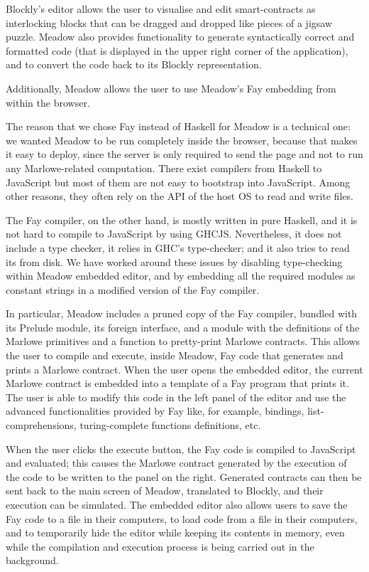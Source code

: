 \documentclass[runningheads]{llncs}
\begin{document}
Blockly's editor allows the user to visualise and edit
smart-contracts as interlocking blocks that can be dragged and dropped
like pieces of a jigsaw puzzle. %
Meadow also provides functionality to generate syntactically correct
and formatted code (that is displayed in the upper right corner of the application),
and to convert the code back to its Blockly representation.

Additionally, Meadow allows the user to use Meadow's Fay embedding from within the browser. %

The reason that we chose Fay instead of Haskell for Meadow is a technical one: we wanted Meadow to be run completely inside 
the browser, because that makes it easy to deploy, since the server is only required to send the page and not to 
run any Marlowe-related computation. There exist compilers from Haskell to JavaScript but most of them are not easy to 
bootstrap into JavaScript. Among other reasons, they often rely on the API of the host OS to read and write files.

The Fay compiler, on the other hand, is mostly written in pure Haskell, and it is not hard to compile to JavaScript by 
using GHCJS. Nevertheless, it does not include a type checker, it relies in GHC's type-checker; and it also 
tries to read its  from disk. We have worked around these issues by disabling type-checking 
within Meadow embedded editor, and by embedding all the required modules as constant strings in a modified version 
of the Fay compiler.

In particular, Meadow includes a pruned copy of the Fay compiler, bundled with its Prelude module, its foreign 
interface, and a module with the definitions of the Marlowe primitives and a function to pretty-print 
Marlowe contracts. This allows the user to compile and execute, inside Meadow, Fay code that generates and prints 
a Marlowe contract. When the user opens the embedded editor, the current Marlowe contract is embedded into a template 
of a Fay program that prints it. The user is able to modify this code in the left panel of the editor and use the 
advanced functionalities provided by Fay like, for example, bindings, list-comprehensions, turing-complete functions 
definitions, etc.

When the user clicks the execute button, the Fay code is compiled to JavaScript and evaluated; this causes the Marlowe 
contract generated by the execution of the code to be written to the panel on the right. Generated contracts can then be 
sent back to the main screen of Meadow, translated to Blockly, and their execution can be simulated. The embedded editor 
also allows users to save the Fay code to a file in their computers, to load code from a file in their computers, and to 
temporarily hide the editor while keeping its contents in memory, even while the compilation and execution process is 
being carried out in the background.
\end{document}
